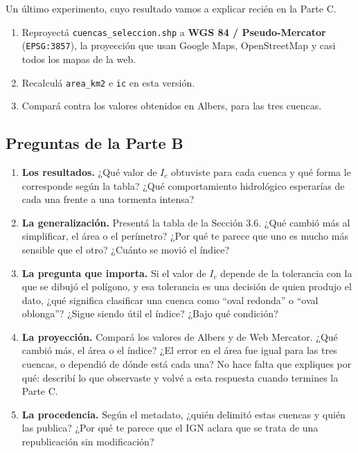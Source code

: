 \documentclass{article}
\begin{document}
Un último experimento, cuyo resultado vamos a explicar recién en la Parte C.

\begin{enumerate}
    \item Reproyectá \texttt{cuencas\_seleccion.shp} a \textbf{WGS 84 / Pseudo-Mercator} (\texttt{EPSG:3857}), la proyección que usan Google Maps, OpenStreetMap y casi todos los mapas de la web.
    \item Recalculá \texttt{area\_km2} e \texttt{ic} en esta versión.
    \item Compará contra los valores obtenidos en Albers, para las tres cuencas.
\end{enumerate}

\subsection{Preguntas de la Parte B}

\begin{enumerate}
    \item \textbf{Los resultados.} ¿Qué valor de $I_c$ obtuviste para cada cuenca y qué forma le corresponde según la tabla? ¿Qué comportamiento hidrológico esperarías de cada una frente a una tormenta intensa?

    \item \textbf{La generalización.} Presentá la tabla de la Sección 3.6. ¿Qué cambió más al simplificar, el área o el perímetro? ¿Por qué te parece que uno es mucho más sensible que el otro? ¿Cuánto se movió el índice?

    \item \textbf{La pregunta que importa.} Si el valor de $I_c$ depende de la tolerancia con la que se dibujó el polígono, y esa tolerancia es una decisión de quien produjo el dato, ¿qué significa clasificar una cuenca como ``oval redonda'' o ``oval oblonga''? ¿Sigue siendo útil el índice? ¿Bajo qué condición?

    \item \textbf{La proyección.} Compará los valores de Albers y de Web Mercator. ¿Qué cambió más, el área o el índice? ¿El error en el área fue igual para las tres cuencas, o dependió de dónde está cada una? No hace falta que expliques por qué: describí lo que observaste y volvé a esta respuesta cuando termines la Parte C.

    \item \textbf{La procedencia.} Según el metadato, ¿quién delimitó estas cuencas y quién las publica? ¿Por qué te parece que el IGN aclara que se trata de una republicación sin modificación?
\end{enumerate}
\end{document}
